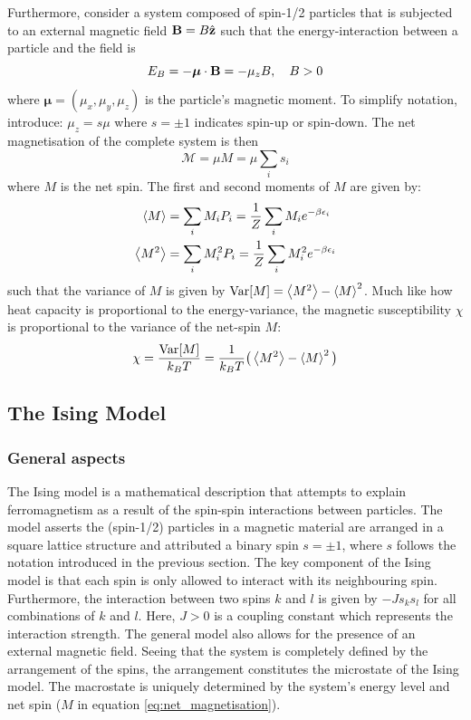 \documentclass[nofootinbib,reprint,english]{revtex4-1}
\begin{document}
Furthermore, consider a system composed of spin-1/2 particles that is subjected to an external magnetic field \(\vb{B}=B\hat{\vb{z}}\) such that the energy-interaction between a particle and the field is
\begin{equation}\label{eq:magnetic_energy_interaction}
E_B=-\boldsymbol{\mu}\cdot\vb{B}=-\mu_zB\qc B>0
\end{equation}
where \(\boldsymbol{\mu}=(\mu_x,\mu_y,\mu_z)\) is the particle's magnetic moment. To simplify notation, introduce: \(\mu_z=s\mu\) where \(s=\pm1\) indicates spin-up or spin-down. The net magnetisation of the complete system is then
\begin{equation}\label{eq:net_magnetisation}
\mathcal{M}=\mu M=\mu\sum_is_i
\end{equation}
where \(M\) is the net spin. The first and second moments of \(M\) are given by:
\begin{subequations}\label{eq:magnetisation_moments}
\begin{align}
\expval{M}  &=\sum_iM_iP_i=\frac{1}{Z}\sum_iM_ie^{-\beta\epsilon_i}\\
\expval{M^2}&=\sum_iM_i^2P_i=\frac{1}{Z}\sum_iM_i^2e^{-\beta\epsilon_i}
\end{align}
\end{subequations}
such that the variance of \(M\) is given by \(\text{Var}[M]=\expval{M^2}-\expval{M}^2\). Much like how heat capacity is proportional to the energy-variance, the magnetic susceptibility \(\chi\) is proportional to the variance of the net-spin \(M\):
\begin{equation}\label{eq:magnetic_sucseptibility}
\chi=\frac{\text{Var}[M]}{k_BT}=\frac{1}{k_BT}\big(\expval{M^2}-\expval{M}^2\big)
\end{equation}

\subsection{The Ising Model}
\subsubsection{General aspects}
The Ising model is a mathematical description that attempts to explain ferromagnetism as a result of the spin-spin interactions between particles. The model asserts the (spin-1/2) particles in a magnetic material are arranged in a square lattice structure and attributed a binary spin \(s=\pm1\), where \(s\) follows the notation introduced in the previous section. The key component of the Ising model is that each spin is only allowed to interact with its neighbouring spin. Furthermore, the interaction between two spins \(k\) and \(l\) is given by \(-Js_ks_l\) for all combinations of \(k\) and \(l\). Here, \(J>0\) is a coupling constant which represents the interaction strength. The general model also allows for the presence of an external magnetic field. Seeing that the system is completely defined by the arrangement of the spins, the arrangement constitutes the microstate of the Ising model. The macrostate is uniquely determined by the system's energy level and net spin (\(M\) in equation \eqref{eq:net_magnetisation}).
\end{document}
